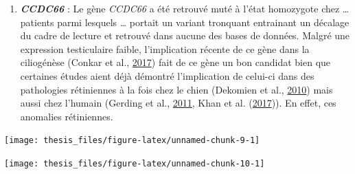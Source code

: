 \documentclass[12pt,twoside]{reedthesis}
\providecommand{\tightlist}{%
  \setlength{\itemsep}{0pt}\setlength{\parskip}{0pt}}
\theoremstyle{definition}
\theoremstyle{definition}
\theoremstyle{remark}
\begin{document}
  \begin{enumerate}
  \def\labelenumi{\arabic{enumi}.}
  \tightlist
  \item
    \textbf{\emph{CCDC66}} : Le gène \emph{CCDC66} a été retrouvé muté à
    l'état homozygote chez \ldots{} patients parmi lesquels \ldots{}
    portait un variant tronquant entrainant un décalage du cadre de
    lecture et retrouvé dans aucune des bases de données. Malgré une
    expression testiculaire faible, l'implication récente de ce gène dans
    la ciliogénèse (Conkar et al.,
    \protect\hyperlink{ref-Conkar2017}{2017}) fait de ce gène un bon
    candidat bien que certaines études aient déjà démontré l'implication
    de celui-ci dans des pathologies rétiniennes à la fois chez le chien
    (Dekomien et al., \protect\hyperlink{ref-Dekomien2010}{2010}) mais
    aussi chez l'humain (Gerding et al.,
    \protect\hyperlink{ref-Gerding2011}{2011}, Khan et al.
    (\protect\hyperlink{ref-Khan2017}{2017})). En effet, ces anomalies
    rétiniennes.
  \end{enumerate}
  
  \newpage
  
  \begin{center}\texttt{[image: thesis\_files/figure-latex/unnamed-chunk-9-1]} \end{center}
  
  \newpage
  
  \begin{center}\texttt{[image: thesis\_files/figure-latex/unnamed-chunk-10-1]} \end{center}
  
  \newpage
  
\end{document}
